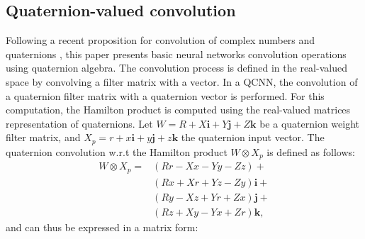 \documentclass[a4paper]{article}
\def\i{\textbf{i}}
\def\j{\textbf{j}}
\begin{document}
\subsection{Quaternion-valued convolution}
\label{subsec:qconv}
Following a recent proposition for convolution of complex numbers\cite{chiheb2017complex} and quaternions \cite{chase2017quat}, this paper presents basic neural networks convolution operations using quaternion algebra. The convolution process is defined in the real-valued space by convolving a filter matrix with a vector. In a QCNN, the convolution of a quaternion filter matrix with a quaternion vector is performed. For this computation, the Hamilton product is computed using the real-valued matrices representation of quaternions. Let $W =R + X\i + Y\j + Z\textbf{k}$ be a quaternion weight filter matrix, and $X_p = r + x\i + y\j + z\textbf{k}$ the quaternion input vector. The quaternion convolution w.r.t the Hamilton product $W \otimes X_p$ is defined as follows:
\begin{align}
W \otimes X_p = &(Rr-Xx-Yy-Zz)+\nonumber \\
			&(Rx+Xr+Yz-Zy)\i+\nonumber \\
            &(Ry-Xz+Yr+Zx)\j+\nonumber \\
            &(Rz+Xy-Yx+Zr)\textbf{k},
\end{align}
and can thus be expressed in a matrix form:
\end{document}

